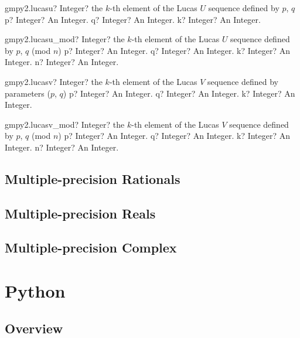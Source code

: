 \documentclass[12pt,a4paper,openany]{book}
\begin{document}
\begin{mpFunctionsExtract}
\mpFunctionThree
{gmpy2.lucasu? Integer? the $k$-th element of the Lucas $U$ sequence defined by $p$, $q$}
{p? Integer? An Integer.}
{q? Integer? An Integer.}
{k? Integer? An Integer.}
\end{mpFunctionsExtract}

\begin{mpFunctionsExtract}
\mpFunctionFour
{gmpy2.lucasu\_mod? Integer? the $k$-th element of the Lucas $U$ sequence defined by $p$, $q$ (mod $n$)}
{p? Integer? An Integer.}
{q? Integer? An Integer.}
{k? Integer? An Integer.}
{n? Integer? An Integer.}
\end{mpFunctionsExtract}

\begin{mpFunctionsExtract}
\mpFunctionThree
{gmpy2.lucasv? Integer? the $k$-th element of the Lucas $V$ sequence defined by parameters ($p$, $q$)}
{p? Integer? An Integer.}
{q? Integer? An Integer.}
{k? Integer? An Integer.}
\end{mpFunctionsExtract}

\begin{mpFunctionsExtract}
\mpFunctionFour
{gmpy2.lucasv\_mod? Integer? the $k$-th element of the Lucas $V$ sequence defined by $p$, $q$ (mod $n$)}
{p? Integer? An Integer.}
{q? Integer? An Integer.}
{k? Integer? An Integer.}
{n? Integer? An Integer.}
\end{mpFunctionsExtract}

\section{Multiple-precision Rationals}

\section{Multiple-precision Reals}

\section{Multiple-precision Complex}

\chapter{Python}

\section{Overview}
\end{document}
